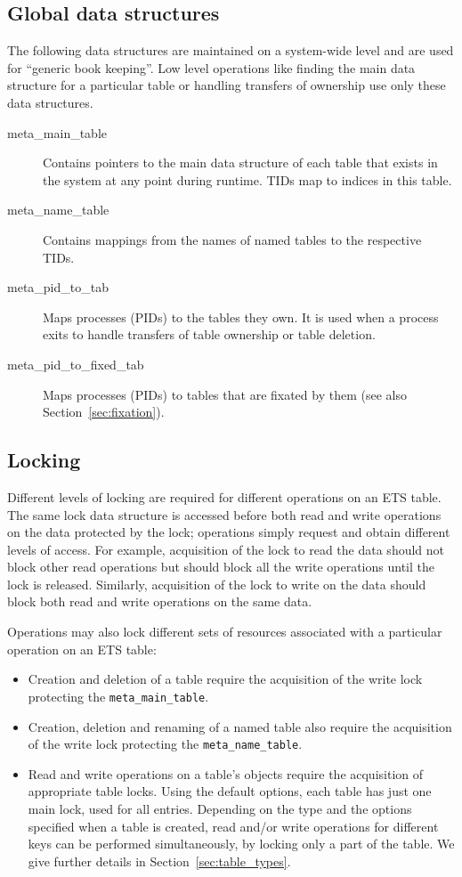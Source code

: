 \documentclass[aps,pre,preprint,nofootinbib]{revtex4}
\begin{document}
\subsection{Global data structures}
\label{sec:tables_overview}

The following data structures are maintained on a system-wide level and are used for ``generic book keeping''.
Low level operations like finding the main data structure for a particular table or handling transfers of ownership use only these data structures.

\begin{description}
\item[meta\_main\_table]
  Contains pointers to the main data structure of each table that exists in the system at any point during runtime.
  TIDs map to indices in this table.
\item[meta\_name\_table]
  Contains mappings from the names of named tables to the respective TIDs.
\item[meta\_pid\_to\_tab]
  Maps processes (PIDs) to the tables they own.
  It is used when a process exits to handle transfers of table ownership or table deletion.
\item[meta\_pid\_to\_fixed\_tab]
  Maps processes (PIDs) to tables that are fixated by them (see also Section~\ref{sec:fixation}).
\end{description}

\subsection{Locking} \label{sec:tables_locking}

Different levels of locking are required for different operations on an ETS table.
The same lock data structure is accessed before both read and write operations on the data protected by the lock; operations simply request and obtain different levels of access.
For example, acquisition of the lock to read the data should not block other read operations but should block all the write operations until the lock is released.
Similarly, acquisition of the lock to write on the data should block both read and write operations on the same data.

Operations may also lock different sets of resources associated with a particular operation on an ETS table:
\begin{itemize}
\item Creation and deletion of a table require the acquisition of the write lock protecting the \verb|meta_main_table|.
\item Creation, deletion and renaming of a named table also require the acquisition of the write lock protecting the \verb|meta_name_table|.
\item Read and write operations on a table's objects require the acquisition of appropriate table locks.
  Using the default options, each table has just one main lock, used for all entries.
  Depending on the type and the options specified when a table is created, read and/or write operations for different keys can be performed simultaneously, by locking only a part of the table.
  We give further details in Section~\ref{sec:table_types}.
\end{itemize}
\end{document}
